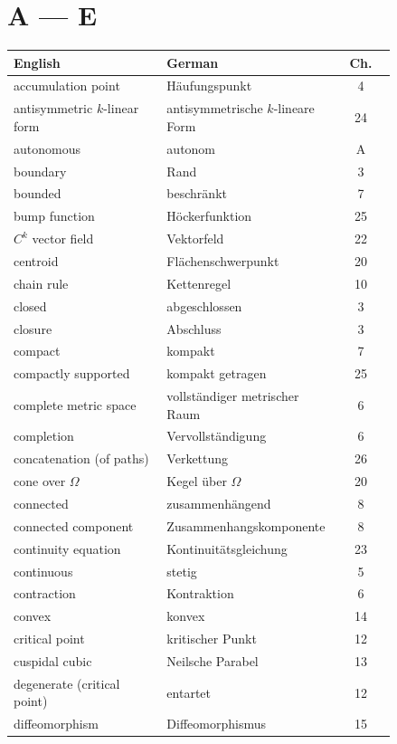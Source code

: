 \section*{A --- E}

\begin{center}
\begin{tabular}{@{}p{0.40\linewidth} p{0.44\linewidth} c@{}}
\textbf{English} & \textbf{German} & \textbf{Ch.} \\
\hline
accumulation point & Häufungspunkt & 4 \\
antisymmetric $k$-linear form & antisymmetrische $k$-lineare Form & 24 \\
autonomous & autonom & A \\
boundary & Rand & 3 \\
bounded & beschränkt & 7 \\
bump function & Höckerfunktion & 25 \\
$C^k$ vector field & Vektorfeld & 22 \\
centroid & Flächenschwerpunkt & 20 \\
chain rule & Kettenregel & 10 \\
closed & abgeschlossen & 3 \\
closure & Abschluss & 3 \\
compact & kompakt & 7 \\
compactly supported & kompakt getragen & 25 \\
complete metric space & vollständiger metrischer Raum & 6 \\
completion & Vervollständigung & 6 \\
concatenation (of paths) & Verkettung & 26 \\
cone over $\Omega$ & Kegel über $\Omega$ & 20 \\
connected & zusammenhängend & 8 \\
connected component & Zusammenhangskomponente & 8 \\
continuity equation & Kontinuitätsgleichung & 23 \\
continuous & stetig & 5 \\
contraction & Kontraktion & 6 \\
convex & konvex & 14 \\
critical point & kritischer Punkt & 12 \\
cuspidal cubic & Neilsche Parabel & 13 \\
degenerate (critical point) & entartet & 12 \\
diffeomorphism & Diffeomorphismus & 15 \\

\end{tabular}
\end{center}

